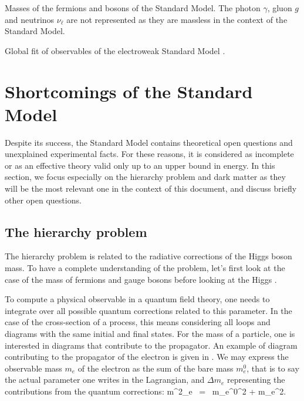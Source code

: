                  {Masses of the fermions and bosons of the Standard Model. The photon
                 $\gamma$, gluon $g$ and neutrinos $\nu_\ell$ are not represented as they
                 are massless in the context of the Standard Model.}

                 {Global fit of observables of the electroweak Standard Model \cite{GFitter}.}

    \section{Shortcomings of the Standard Model \label{sec:standardModelShortcomings}}

    Despite its success, the Standard Model contains theoretical open questions
    and unexplained experimental facts. For these reasons, it is considered as
    incomplete or as an effective theory valid only up to an upper bound in
    energy.  In this section, we focus especially on the hierarchy problem and
    dark matter as they will be the most relevant one in the context of this
    document, and discuss briefly other open questions.

        \subsection{The hierarchy problem}

    The hierarchy problem is related to the radiative corrections of the Higgs
    boson mass.  To have a complete understanding of the problem, let's first
    look at the case of the mass of fermions and gauge bosons before looking at
    the Higgs \cite{SupersymmetryDemystified}.

    To compute a physical observable in a quantum field theory, one needs to
    integrate over all possible quantum corrections related to this parameter.
    In the case of the cross-section of a process, this means considering all
    loops and diagrams with the same initial and final states. For the mass of a
    particle, one is interested in diagrams that contribute to the propagator.
    An example of diagram contributing to the propagator of the electron is
    given in . We may
    express the observable mass $m_e$ of the electron as the sum of the bare
    mass $m^0_{e}$, that is to say the actual parameter one writes in the
    Lagrangian, and $\Delta m_e$ representing the contributions from the quantum
    corrections:
    {
        m^2_e \, = \, {m_e^0}^2 + \Delta m_e^2.
    }

